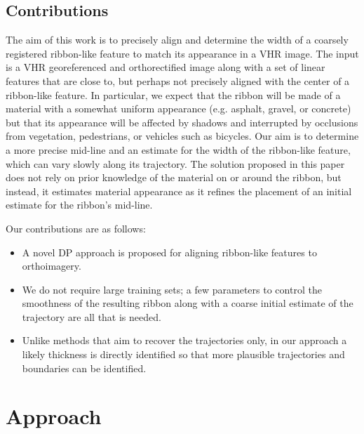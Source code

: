 \subsection{Contributions}
The aim of this work is to precisely align and determine the width of a coarsely registered ribbon-like feature to match its appearance in a \ac{VHR} image. 
The input is a \ac{VHR} georeferenced and orthorectified image along with a set of linear features that are close to, but perhaps not precisely aligned with the center of a ribbon-like feature. 
In particular, we expect that the ribbon will be made of a material with a somewhat uniform appearance (e.g. asphalt, gravel, or concrete) but that its appearance will be affected by shadows and interrupted by occlusions from vegetation, pedestrians, or vehicles such as bicycles.  
Our aim is to determine a more precise mid-line and an estimate for the width of the ribbon-like feature, which can vary slowly along its trajectory. 
The solution proposed in this paper does not rely on prior knowledge of the material on or around the ribbon, but instead, it estimates material appearance as it refines the placement of an initial estimate for the ribbon's mid-line.
	
Our contributions are as follows:
	\begin{itemize}
		\item A novel \ac{DP} approach is proposed for aligning ribbon-like features to orthoimagery.
		\item We do not require large training sets; a few parameters to control the smoothness of the resulting ribbon along with a coarse initial estimate of the trajectory are all that is needed. 
		\item Unlike methods that aim to recover the trajectories only, in our approach a likely thickness is directly identified so that more plausible trajectories and boundaries can be identified.
	\end{itemize}


\section{Approach} \label{sec:approach}


